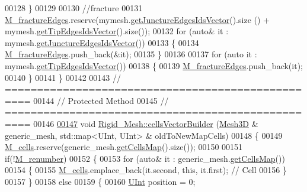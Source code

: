 \begin{DoxyCode}
00128     \}
00129 
00130     \textcolor{comment}{//fracture}
00131     \hyperlink{classFVCode3D_1_1Rigid__Mesh_af4626d6b92116a3f6e925847f413da2b}{M\_fractureEdges}.reserve(mymesh.\hyperlink{classFVCode3D_1_1Rigid__Mesh_ab5e13da1e797fbbb301b15272a96c27a}{getJunctureEdgesIdsVector}().size
      () + mymesh.\hyperlink{classFVCode3D_1_1Rigid__Mesh_af886299593ba5c9f9a33ee9d8ff4d4a6}{getTipEdgesIdsVector}().size());
00132     \textcolor{keywordflow}{for} (\textcolor{keyword}{auto}& it : mymesh.\hyperlink{classFVCode3D_1_1Rigid__Mesh_ab5e13da1e797fbbb301b15272a96c27a}{getJunctureEdgesIdsVector}())
00133     \{
00134         \hyperlink{classFVCode3D_1_1Rigid__Mesh_af4626d6b92116a3f6e925847f413da2b}{M\_fractureEdges}.push\_back(&it);
00135     \}
00136 
00137     \textcolor{keywordflow}{for} (\textcolor{keyword}{auto} it : mymesh.\hyperlink{classFVCode3D_1_1Rigid__Mesh_af886299593ba5c9f9a33ee9d8ff4d4a6}{getTipEdgesIdsVector}())
00138     \{
00139         \hyperlink{classFVCode3D_1_1Rigid__Mesh_af4626d6b92116a3f6e925847f413da2b}{M\_fractureEdges}.push\_back(it);
00140     \}
00141 \}
00142 
00143 \textcolor{comment}{// ==================================================}
00144 \textcolor{comment}{// Protected Method}
00145 \textcolor{comment}{// ==================================================}
00146 
\hypertarget{RigidMesh_8cpp_source.tex_l00147}{}\hyperlink{classFVCode3D_1_1Rigid__Mesh_a3ddbd3589db60840edbbd76d4a69ec0a}{00147} \textcolor{keywordtype}{void} \hyperlink{classFVCode3D_1_1Rigid__Mesh_a3ddbd3589db60840edbbd76d4a69ec0a}{Rigid\_Mesh::cellsVectorBuilder} (\hyperlink{classFVCode3D_1_1Mesh3D}{Mesh3D} & generic\_mesh, 
      std::map<UInt, UInt> & oldToNewMapCells)
00148 \{
00149     \hyperlink{classFVCode3D_1_1Rigid__Mesh_ad19dc70b4efddafb6e8d8d4980bd23d6}{M\_cells}.reserve(generic\_mesh.\hyperlink{classFVCode3D_1_1Mesh3D_ad904ef5e068c89951d77e9364e960bf3}{getCellsMap}().size());
00150 
00151     \textcolor{keywordflow}{if}(!\hyperlink{classFVCode3D_1_1Rigid__Mesh_a3d9468c34407de926f494d4aa47af64f}{M\_renumber})
00152     \{
00153         \textcolor{keywordflow}{for} (\textcolor{keyword}{auto}& it : generic\_mesh.\hyperlink{classFVCode3D_1_1Mesh3D_ad904ef5e068c89951d77e9364e960bf3}{getCellsMap}())
00154         \{
00155             \hyperlink{classFVCode3D_1_1Rigid__Mesh_ad19dc70b4efddafb6e8d8d4980bd23d6}{M\_cells}.emplace\_back(it.second, \textcolor{keyword}{this}, it.first); \textcolor{comment}{// Cell}
00156         \}
00157     \}
00158     \textcolor{keywordflow}{else}
00159     \{
00160         \hyperlink{namespaceFVCode3D_a4bf7e328c75d0fd504050d040ebe9eda}{UInt} position = 0;

\end{DoxyCode}
